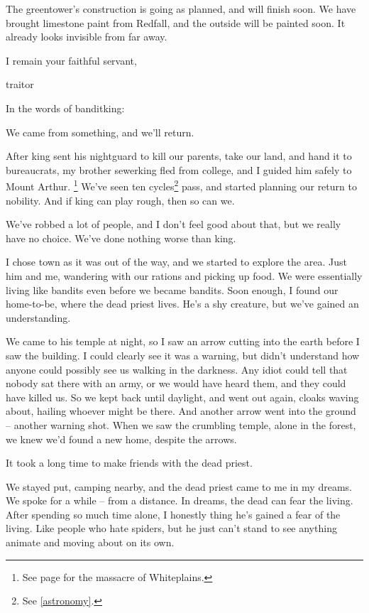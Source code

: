 \begin{multicols}{2}
\begin{exampletext}
  The \gls{greentower}'s construction is going as planned, and will finish soon.
  We have brought limestone paint from Redfall, and the outside will be painted soon.
  It already looks invisible from far away.

  I remain your faithful servant,

  \gls{traitor}

\end{exampletext}

In the words of \gls{banditking}:

\begin{exampletext}

  We came from something, and we'll return.

  After \gls{king} sent his \gls{nightguard} to kill our parents, take our land, and hand it to bureaucrats, my brother \gls{sewerking} fled from \gls{college}, and I guided him safely to Mount Arthur.
  \footnote{See page \pageref{whiteplainsWar} for the massacre of Whiteplains.}
  We've seen ten cycles\footnote{See \autoref{astronomy}.} pass, and started planning our return to nobility.
  And if \gls{king} can play rough, then so can we.

  We've robbed a lot of people, and I don't feel good about that, but we really have no choice.
  We've done nothing worse than \gls{king}.

  I chose \gls{town} as it was out of the way, and we started to explore the area.
  Just him and me, wandering with our rations and picking up food.
  We were essentially living like bandits even before we became bandits.
  Soon enough, I found our home-to-be, where the dead priest lives.
  He's a shy creature, but we've gained an understanding.

  We came to his temple at night, so I saw an arrow cutting into the earth before I saw the building.
  I could clearly see it was a warning, but didn't understand how anyone could possibly see us walking in the darkness.
  Any idiot could tell that nobody sat there with an army, or we would have heard them, and they could have killed us.
  So we kept back until daylight, and went out again, cloaks waving about, hailing whoever might be there.
  And another arrow went into the ground -- another warning shot.
  When we saw the crumbling temple, alone in the forest, we knew we'd found a new home, despite the arrows.

  It took a long time to make friends with the dead priest.

  We stayed put, camping nearby, and the dead priest came to me in my dreams.
  We spoke for a while -- from a distance.
  In dreams, the dead can fear the living.
  After spending so much time alone, I honestly thing he's gained a fear of the living.
  Like people who hate spiders, but he just can't stand to see anything animate and moving about on its own.


\end{exampletext}
\end{multicols}
